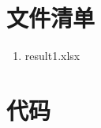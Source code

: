 \documentclass[UTF-8,a4paper,zihao=-4]{ctexart}
\begin{document}
\section{文件清单}

\begin{enumerate}
    \item result1.xlsx
\end{enumerate}

\section{代码}














\end{document}
